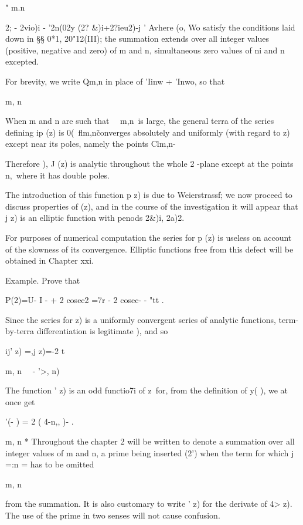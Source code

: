  " m.n \ \ {2; - 2vio)i - '2n(02y (2? \&)i+2?ieu2)-j ' Avhere (o, Wo
satisfy the conditions laid down in §§ 0*1, 20"12(III); the summation
extends over all integer values (positive, negative and zero) of m and
n, simultaneous zero values of ni and n excepted.

For brevity, we write Qm,n in place of 'Iinw + 'Inwo, so that

m, n

When m and n are such that \ \ m,n\ is large, the general terra of the
series defining ip (z) is 0(\ flm,n\~%
converges absolutely and uniformly (with regard to z) except near its
poles, namely the points Clm,n-

Therefore ), J (z) is analytic throughout the whole 2 -plane
except at the points n,\, where it has double poles.

The introduction of this function p z) is due to Weierstrassf; we now
proceed to discuss properties of (z), and in the course of the
investigation it will appear that j z) is an elliptic function with
penods 2\&)i, 2a)2.

For purposes of numerical computation the series for p (z) is useless
on account of the slowness of its convergence. Elliptic functions free
from this defect will be obtained in Chapter xxi.

Example. Prove that

P(2)=U- I - + 2 cosec2 =7r - 2 cosec- - "tt .


Since the series for z) is a uniformly convergent series of analytic
functions, term-by-terra differentiation is legitimate ), and so

ij' z) =,j z)=-2 t

  m, n \ \ - '>, n)

The function ' z) is an odd functio7i of z\ for, from the definition
of y( ), we at once get

 '(- ) = 2 ( 4-n,, )- .

m, n * Throughout the chapter 2 will be written to denote a summation
over all integer values of m and n, a prime being inserted (2') when
the term for which j =:n = has to be omitted

m, n

from the summation. It is also customary to write ' z) for the
derivate of 4> z). The use of the prime in two senses will not cause
confusion.

}
